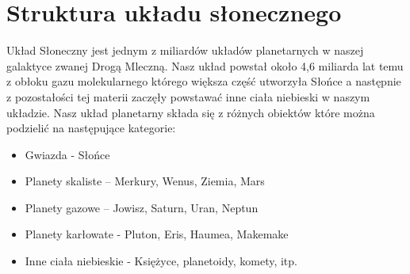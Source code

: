 \section{Struktura układu słonecznego}
Układ Słoneczny jest jednym z miliardów układów planetarnych w naszej galaktyce zwanej Drogą Mleczną. Nasz układ powstał około 4,6 miliarda lat temu z obłoku gazu molekularnego którego większa część utworzyła Słońce a następnie z pozostałości tej materii zaczęły powstawać inne ciała niebieski w naszym układzie.
Nasz układ planetarny składa się z różnych obiektów które można podzielić na następujące kategorie: 
\begin{itemize}
\item  Gwiazda - Słońce 
\item  Planety skaliste – Merkury, Wenus, Ziemia, Mars 
\item  Planety gazowe – Jowisz, Saturn, Uran, Neptun  
\item  Planety karłowate - Pluton, Eris, Haumea, Makemake
\item  Inne ciała niebieskie - Księżyce, planetoidy, komety, itp. 
\end{itemize}
